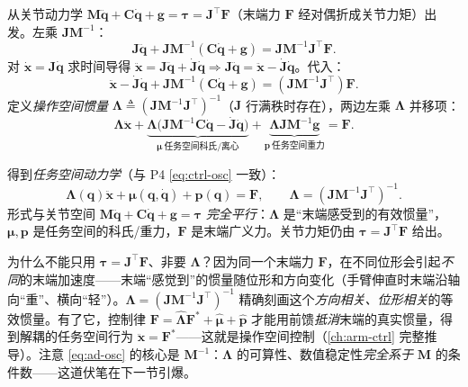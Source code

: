 \begin{derivation}[操作空间惯量 $\boldsymbol{\Lambda}=(\mathbf{J}\mathbf{M}^{-1}\mathbf{J}^\top)^{-1}$ 的来历]
从关节动力学 $\mathbf{M}\ddot{\mathbf{q}}+\mathbf{C}\dot{\mathbf{q}}+\mathbf{g}=\boldsymbol{\tau}=\mathbf{J}^\top\mathbf{F}$（末端力 $\mathbf{F}$ 经对偶折成关节力矩）出发。左乘 $\mathbf{J}\mathbf{M}^{-1}$：
\[
  \mathbf{J}\ddot{\mathbf{q}}+\mathbf{J}\mathbf{M}^{-1}(\mathbf{C}\dot{\mathbf{q}}+\mathbf{g})=\mathbf{J}\mathbf{M}^{-1}\mathbf{J}^\top\mathbf{F}.
\]
对 $\dot{\mathbf{x}}=\mathbf{J}\dot{\mathbf{q}}$ 求时间导得 $\ddot{\mathbf{x}}=\mathbf{J}\ddot{\mathbf{q}}+\dot{\mathbf{J}}\dot{\mathbf{q}}\Rightarrow\mathbf{J}\ddot{\mathbf{q}}=\ddot{\mathbf{x}}-\dot{\mathbf{J}}\dot{\mathbf{q}}$。代入：
\[
  \ddot{\mathbf{x}}-\dot{\mathbf{J}}\dot{\mathbf{q}}+\mathbf{J}\mathbf{M}^{-1}(\mathbf{C}\dot{\mathbf{q}}+\mathbf{g})=(\mathbf{J}\mathbf{M}^{-1}\mathbf{J}^\top)\mathbf{F}.
\]
定义\emph{操作空间惯量} $\boldsymbol{\Lambda}\triangleq(\mathbf{J}\mathbf{M}^{-1}\mathbf{J}^\top)^{-1}$（$\mathbf{J}$ 行满秩时存在），两边左乘 $\boldsymbol{\Lambda}$ 并移项：
\[
  \boldsymbol{\Lambda}\ddot{\mathbf{x}}+\underbrace{\boldsymbol{\Lambda}\big(\mathbf{J}\mathbf{M}^{-1}\mathbf{C}\dot{\mathbf{q}}-\dot{\mathbf{J}}\dot{\mathbf{q}}\big)}_{\boldsymbol{\mu}\ \text{任务空间科氏/离心}}+\underbrace{\boldsymbol{\Lambda}\mathbf{J}\mathbf{M}^{-1}\mathbf{g}}_{\mathbf{p}\ \text{任务空间重力}}=\mathbf{F}.
\]
\end{derivation}

\noindent 得到\emph{任务空间动力学}（与 P4 \cref{eq:ctrl-osc} 一致）：
\begin{equation}
  \boxed{\;\boldsymbol{\Lambda}(\mathbf{q})\ddot{\mathbf{x}}+\boldsymbol{\mu}(\mathbf{q},\dot{\mathbf{q}})+\mathbf{p}(\mathbf{q})=\mathbf{F},\qquad \boldsymbol{\Lambda}=(\mathbf{J}\mathbf{M}^{-1}\mathbf{J}^\top)^{-1}.\;}
  \label{eq:ad-osc}
\end{equation}
形式与关节空间 $\mathbf{M}\ddot{\mathbf{q}}+\mathbf{C}\dot{\mathbf{q}}+\mathbf{g}=\boldsymbol{\tau}$ \emph{完全平行}：$\boldsymbol{\Lambda}$ 是“末端感受到的有效惯量”，$\boldsymbol{\mu},\mathbf{p}$ 是任务空间的科氏/重力，$\mathbf{F}$ 是末端广义力。关节力矩仍由 $\boldsymbol{\tau}=\mathbf{J}^\top\mathbf{F}$ 给出。

\begin{insight}
\label{ins:ad-Lambda-meaning}
为什么不能只用 $\boldsymbol{\tau}=\mathbf{J}^\top\mathbf{F}$、非要 $\boldsymbol{\Lambda}$？因为同一个末端力 $\mathbf{F}$，在不同位形会引起\emph{不同}的末端加速度——末端“感觉到”的惯量随位形和方向变化（手臂伸直时末端沿轴向“重”、横向“轻”）。$\boldsymbol{\Lambda}=(\mathbf{J}\mathbf{M}^{-1}\mathbf{J}^\top)^{-1}$ 精确刻画这个\emph{方向相关、位形相关}的等效惯量。有了它，控制律 $\mathbf{F}=\hat{\boldsymbol{\Lambda}}\mathbf{F}^*+\hat{\boldsymbol{\mu}}+\hat{\mathbf{p}}$ 才能用前馈\emph{抵消}末端的真实惯量，得到解耦的任务空间行为 $\ddot{\mathbf{x}}=\mathbf{F}^*$——这就是操作空间控制（\cref{ch:arm-ctrl} 完整推导）。注意 \cref{eq:ad-osc} 的核心是 $\mathbf{M}^{-1}$：$\boldsymbol{\Lambda}$ 的可算性、数值稳定性\emph{完全系于} $\mathbf{M}$ 的条件数——这道伏笔在下一节引爆。
\end{insight}


